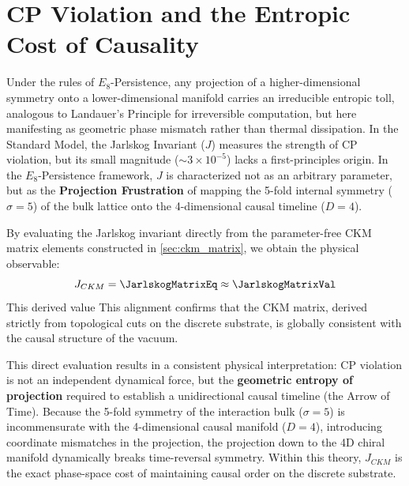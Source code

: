
\section{CP Violation and the Entropic Cost of Causality}

Under the rules of $E_8$-Persistence, any projection of a higher-dimensional symmetry onto a lower-dimensional manifold carries an irreducible entropic toll, analogous to Landauer's Principle for irreversible computation, but here manifesting as geometric phase mismatch rather than thermal dissipation. In the Standard Model, the Jarlskog Invariant ($J$) measures the strength of CP violation, but its small magnitude ($\sim 3 \times 10^{-5}$) lacks a first-principles origin. In the $E_8$-Persistence framework, $J$ is characterized not as an arbitrary parameter, but as the \textbf{Projection Frustration} of mapping the 5-fold internal symmetry ($\sigma=5$) of the bulk lattice onto the 4-dimensional causal timeline ($D=4$).

By evaluating the Jarlskog invariant directly from the parameter-free CKM matrix elements constructed in \cref{sec:ckm_matrix}, we obtain the physical observable:
\begin{equation}
    J_{CKM} = \JarlskogMatrixEq \approx \mathbf{\JarlskogMatrixVal}
\end{equation}
This derived value \JarlskogMatrixAccText This alignment confirms that the CKM matrix, derived strictly from topological cuts on the discrete substrate, is globally consistent with the causal structure of the vacuum.

This direct evaluation results in a consistent physical interpretation: CP violation is not an independent dynamical force, but the \textbf{geometric entropy of projection} required to establish a unidirectional causal timeline (the Arrow of Time). Because the 5-fold symmetry of the interaction bulk ($\sigma=5$) is incommensurate with the 4-dimensional causal manifold ($D=4$), introducing coordinate mismatches in the projection, the projection down to the 4D chiral manifold dynamically breaks time-reversal symmetry. Within this theory, $J_{CKM}$ is the exact phase-space cost of maintaining causal order on the discrete substrate.

